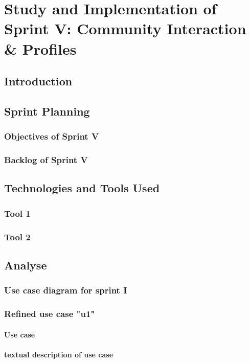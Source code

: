 \chapter[Sprint V]{Study and Implementation of Sprint V: Community Interaction \& Profiles}

\minitoc
\section{Introduction}
\section{Sprint Planning}
\subsection{Objectives of Sprint V}
\subsection{Backlog of Sprint V}
\section{Technologies and Tools Used}
\subsection{Tool 1}
\subsection{Tool 2}


\section{Analyse}
\subsection{Use case diagram for sprint I}
\subsection{Refined use case "u1"}
\subsubsection{Use case}
\subsubsection{textual description of use case}
